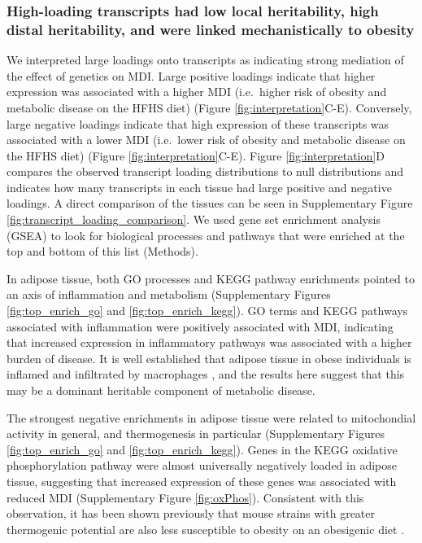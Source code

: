 \documentclass[
]{article}
\begin{document}
\subsubsection{High-loading transcripts had low local heritability, high
distal heritability, and were linked mechanistically to
obesity}\label{high-loading-transcripts-had-low-local-heritability-high-distal-heritability-and-were-linked-mechanistically-to-obesity}

We interpreted large loadings onto transcripts as indicating strong
mediation of the effect of genetics on MDI. Large positive loadings
indicate that higher expression was associated with a higher MDI
(i.e.~higher risk of obesity and metabolic disease on the HFHS diet)
(Figure \ref{fig:interpretation}C-E). Conversely, large negative
loadings indicate that high expression of these transcripts was
associated with a lower MDI (i.e.~lower risk of obesity and metabolic
disease on the HFHS diet) (Figure \ref{fig:interpretation}C-E). Figure
\ref{fig:interpretation}D compares the observed transcript loading
distributions to null distributions and indicates how many transcripts
in each tissue had large positive and negative loadings. A direct
comparison of the tissues can be seen in Supplementary Figure
\ref{fig:transcript_loading_comparison}. We used gene set enrichment
analysis (GSEA) \cite{fgsea, 
pmid16199517} to look for biological processes and pathways that were
enriched at the top and bottom of this list (Methods).

In adipose tissue, both GO processes and KEGG pathway enrichments
pointed to an axis of inflammation and metabolism (Supplementary Figures
\ref{fig:top_enrich_go} and \ref{fig:top_enrich_kegg}). GO terms and
KEGG pathways associated with inflammation were positively associated
with MDI, indicating that increased expression in inflammatory pathways
was associated with a higher burden of disease. It is well established
that adipose tissue in obese individuals is inflamed and infiltrated by
macrophages \cite{pmid19133410, 
pmid28955384, pmid28912810, pmid28901330, pmid24969772}, and the results
here suggest that this may be a dominant heritable component of
metabolic disease.

The strongest negative enrichments in adipose tissue were related to
mitochondial activity in general, and thermogenesis in particular
(Supplementary Figures \ref{fig:top_enrich_go} and
\ref{fig:top_enrich_kegg}). Genes in the KEGG oxidative phosphorylation
pathway were almost universally negatively loaded in adipose tissue,
suggesting that increased expression of these genes was associated with
reduced MDI (Supplementary Figure \ref{fig:oxPhos}). Consistent with
this observation, it has been shown previously that mouse strains with
greater thermogenic potential are also less susceptible to obesity on an
obesigenic diet \cite{pmid18492779}.
\end{document}
